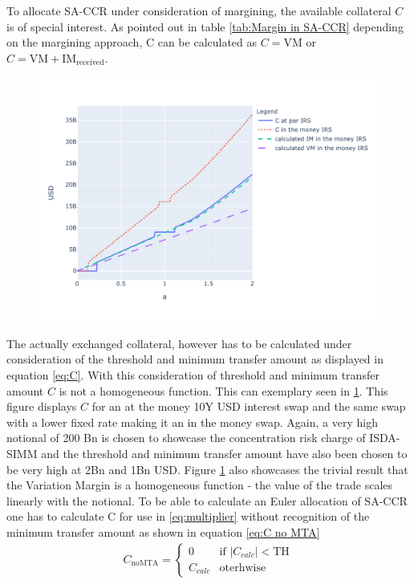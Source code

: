 \documentclass[../Thesis_AHoecherl.tex]{subfiles}
\begin{document}
    To allocate \gls{SA-CCR} under consideration of margining, the available collateral $C$ is of special interest. As pointed out in table \ref{tab:Margin in SA-CCR} depending on the margining approach, C can be calculated as $C = \text{VM}$ or $C = \text{VM} + \text{IM}_{\text{received}}$.
    \begin{figure}
        \centering
        \includegraphics{Graphics/C_homogenity.pdf}
        \caption{}
        \label{fig:homogeneity of C}
    \end{figure}
    The actually exchanged collateral, however has to be calculated under consideration of the threshold and minimum transfer amount as displayed in equation \ref{eq:C}. With this consideration of threshold and minimum transfer amount $C$ is not a homogeneous function. 
    This can exemplary seen in \ref{fig:homogeneity of C}. This figure displays $C$ for an at the money 10Y USD interest swap and the same swap with a lower fixed rate making it an in the money swap. Again, a very high notional of 200 Bn is chosen to showcase the concentration risk charge of ISDA-SIMM and the threshold and minimum transfer amount have also been chosen to be very high at 2Bn and 1Bn USD.
    Figure \ref{fig:homogeneity of C} also showcases the trivial result that the Variation Margin is a homogeneous function - the value of the trade scales linearly with the notional.
    To be able to calculate an Euler allocation of SA-CCR one has to calculate C for use in \ref{eq:multiplier} without recognition of the minimum transfer amount as shown in equation \ref{eq:C no MTA}
    \begin{align}
        \label{eq:C no MTA}
        C_{\text{noMTA}} = \begin{cases}
            0  &\text{if } |C_{calc}|<\text{TH}\\
            C_{calc} &\text{oterhwise}
        \end{cases}
    \end{align}
    
\end{document}
